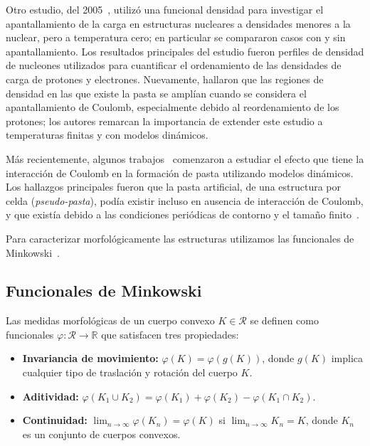 Otro estudio, del 2005~\cite{maruyama_nuclear_2005}, utilizó una funcional densidad para investigar el apantallamiento de la carga en estructuras nucleares a densidades menores a la nuclear, pero a temperatura cero; en particular se compararon casos con y sin apantallamiento.
Los resultados principales del estudio fueron perfiles de densidad de nucleones utilizados para cuantificar el ordenamiento de las densidades de carga de protones y electrones.
Nuevamente, hallaron que las regiones de densidad en las que existe la pasta se amplían cuando se considera el apantallamiento de Coulomb, especialmente debido al reordenamiento de los protones; los autores remarcan la importancia de extender este estudio a temperaturas finitas y con modelos dinámicos.

Más recientemente, algunos trabajos~\cite{schneider_nuclear_2013,gimenez_molinelli_simulations_2014} comenzaron a estudiar el efecto que tiene la interacción de Coulomb en la formación de pasta utilizando modelos dinámicos.
Los hallazgos principales fueron que la pasta artificial, de una estructura por celda (\emph{pseudo-pasta}), podía existir incluso en ausencia de interacción de Coulomb, y que existía debido a las condiciones periódicas de contorno y el tamaño finito~\cite{binder_beyond_2012}.

Para caracterizar morfológicamente las estructuras utilizamos las funcionales de Minkowski~\cite{michielsen_integral-geometry_2001}.

\subsection{Funcionales de Minkowski}

Las medidas morfológicas de un cuerpo convexo $K \in \mathcal{R}$ se definen como funcionales $\varphi: \mathcal{R} \rightarrow \mathbb{R}$ que satisfacen tres propiedades:

\begin{itemize}
  \item \textbf{Invariancia de movimiento:} $\varphi(K) = \varphi(g(K))$, donde $g(K)$ implica cualquier tipo de traslación y rotación del cuerpo $K$.
  \item \textbf{Aditividad:} $\varphi(K_1 \cup K_2) = \varphi(K_1) + \varphi(K_2) - \varphi(K_1 \cap K_2)$.
  \item \textbf{Continuidad:} $\lim_{n\rightarrow\infty}\varphi(K_n) = \varphi(K)$ si $\lim_{n\rightarrow\infty}K_n = K$, donde ${K_n}$ es un conjunto de cuerpos convexos.
\end{itemize}

